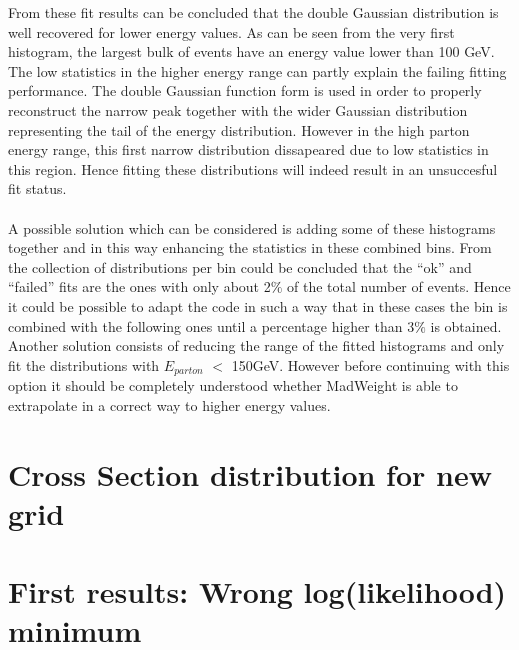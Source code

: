 From these fit results can be concluded that the double Gaussian distribution is well recovered for lower energy values. As can be seen from the very first histogram, the largest bulk of events have an energy value lower than 100 GeV. The low statistics in the higher energy range can partly explain the failing fitting performance. The double Gaussian function form is used in order to properly reconstruct the narrow peak together with the wider Gaussian distribution representing the tail of the energy distribution. However in the high parton energy range, this first narrow distribution dissapeared due to low statistics in this region. Hence fitting these distributions will indeed result in an unsuccesful fit status.\\
\\
A possible solution which can be considered is adding some of these histograms together and in this way enhancing the statistics in these combined bins. From the collection of distributions per bin could be concluded that the ``ok'' and ``failed'' fits are the ones with only about 2$\%$ of the total number of events. Hence it could be possible to adapt the code in such a way that in these cases the bin is combined with the following ones until a percentage higher than 3$\%$ is obtained.\\
Another solution consists of reducing the range of the fitted histograms and only fit the distributions with $E_{parton}$ $<$ 150GeV. However before continuing with this option it should be completely understood whether MadWeight is able to extrapolate in a correct way to higher energy values.

\newpage
\section{Cross Section distribution for new grid}

\section{First results: Wrong log(likelihood) minimum}

